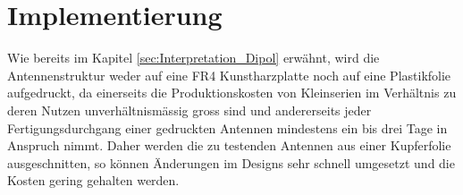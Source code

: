 \newpage 
\thispagestyle{empty}
\chapter{Implementierung}\label{sec:Implementierung}
Wie bereits im Kapitel \ref{sec:Interpretation_Dipol} erwähnt, wird die Antennenstruktur weder auf eine FR4 Kunstharzplatte noch auf eine Plastikfolie aufgedruckt, da einerseits die Produktionskosten von Kleinserien im Verhältnis zu deren Nutzen unverhältnismässig gross sind und andererseits jeder Fertigungsdurchgang einer gedruckten Antennen mindestens ein bis drei Tage in Anspruch nimmt. Daher werden die zu testenden Antennen aus einer Kupferfolie ausgeschnitten, so können Änderungen im Designs sehr schnell umgesetzt und die Kosten gering gehalten werden.\\

